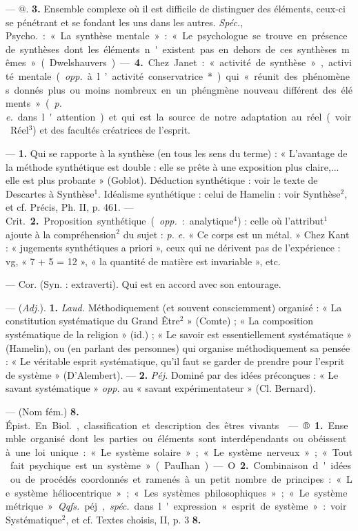 \begin{itemize}[leftmargin=1cm, label=, itemsep=1pt]
— @. {\bf 3.} Ensemble complexe où il
est difficile de distinguer des éléments, ceux-ci se pénétrant et se
fondant les uns dans les autres.
{\it Spéc.}, \si{Psycho.} : « La synthèse mentale » : « Le psychologue se trouve
en présence de synthèses dont les
éléments n'existent pas en dehors
de ces synthèses mêmes. » (Dwelshauvers). — {\bf 4.} Chez Janet : « activité
de synthèse », activité mentale
({\it opp.} à l’activité conservatrice*) qui
« réunit des phénomènes donnés
plus ou moins nombreux en un phéngmène nouveau différent des éléments » ({\it p. e.} dans l'attention) et qui
est la source de notre adaptation au
réel (voir Réel$^3$) et des facultés créatrices de l'esprit.

 — {\bf 1.} Qui se rapporte à
la synthèse (en tous les sens du
terme) : « L'avantage de la méthode
synthétique est double : elle se
prête à une exposition plus claire,...
elle est plus probante » (Goblot).
Déduction synthétique : voir le texte
de Descartes à Synthèse$^1$. Idéalisme
synthétique : celui de Hamelin : voir
Synthèse$^2$, et cf. Précis, Ph. II,
p. 461.
— \si{Crit.} {\bf 2.} Proposition synthétique ({\it opp.} : analytique$^4$) : celle où
l’attribut$^1$ ajoute à la compréhension$^2$ du sujet : {\it p. e.} « Ce corps est un
métal. » Chez Kant : « jugements
synthétiques a priori », ceux qui ne
dérivent pas de l'expérience : vg,
« 7 + 5 = 12 », « la quantité de
matière est invariable », etc.

 — Cor. (Syn. : extraverti). Qui
est en accord avec son entourage.

 — ({\it Adj.}). {\bf 1.} {\it Laud.} Méthodiquement (et souvent consciemment) organisé : « La constitution
systématique du Grand Être$^2$ »
(Comte) ; « La composition systématique de la religion » (id.) ; « Le
savoir est essentiellement systématique » (Hamelin), ou (en parlant
des personnes) qui organise méthodiquement sa pensée : « Le véritable
esprit systématique, qu'il faut se
garder de prendre pour l'esprit de
système » (D'Alembert). — {\bf 2.} {\it Péj.}
Dominé par des idées préconçues :
« Le savant systématique » {\it opp.} au
« savant expérimentateur » (Cl. Bernard).

— (Nom fém.) {\bf 8.} \si{Épist.} En \si{Biol.},
classification et description des
êtres vivants.

 — ®. {\bf 1.} Ensemble organisé
dont les parties ou éléments sont
interdépendants ou obéissent à une
loi unique : « Le système solaire »;
« Le système nerveux »; « Tout fait
psychique est un système » (PauIhan). — O. {\bf 2.} Combinaison d'idées
ou de procédés coordonnés et ramenés à un petit nombre de principes :
« Le système héliocentrique »; « Les
systèmes philosophiques »; « Le
système métrique » {\it Qqfs.} péj., {\it spéc.}
dans l'expression « esprit de système » : voir Systématique$^2$, et cf.
Textes choisis, II, p. 3 {\bf 8.}

	\end{itemize}
